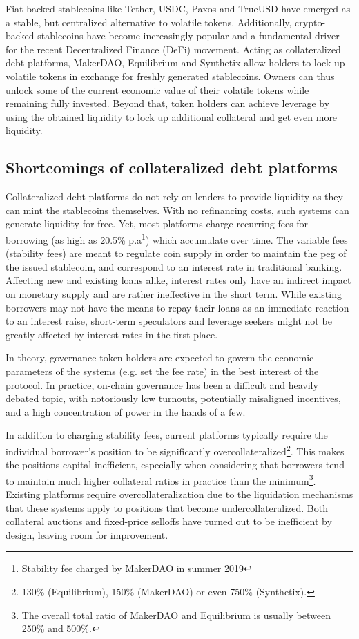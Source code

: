 \documentclass{article}
\begin{document}
Fiat-backed stablecoins like Tether, USDC, Paxos and TrueUSD have emerged as a stable, but centralized alternative to volatile tokens. Additionally, crypto-backed stablecoins have become increasingly popular and a fundamental driver for the recent Decentralized Finance (DeFi) movement. Acting as collateralized debt platforms, MakerDAO, Equilibrium and Synthetix allow holders to lock up volatile tokens in exchange for freshly generated stablecoins. Owners can thus unlock some of the current economic value of their volatile tokens while remaining fully invested. Beyond that, token holders can achieve leverage by using the obtained liquidity to lock up additional collateral and get even more liquidity.
\subsection{Shortcomings of collateralized debt platforms}
Collateralized debt platforms do not rely on lenders to provide liquidity as they can mint the stablecoins themselves. With no refinancing costs, such systems can generate liquidity for free. Yet, most platforms charge recurring fees for borrowing (as high as 20.5\% p.a\footnote{Stability fee charged by MakerDAO in summer 2019}) which accumulate over time. The variable fees (stability fees) are meant to regulate coin supply in order to maintain the peg of the issued stablecoin, and correspond to an interest rate in traditional banking. Affecting new and existing loans alike, interest rates only have an indirect impact on monetary supply and are rather ineffective in the short term. While existing borrowers may not have the means to repay their loans as an immediate reaction to an interest raise, short-term speculators and leverage seekers might not be greatly affected by interest rates in the first place.

In theory, governance token holders are expected to govern the economic parameters of the systems (e.g. set the fee rate) in the best interest of the protocol. In practice, on-chain governance has been a difficult and heavily debated topic, with notoriously low turnouts, potentially misaligned incentives, and a high concentration of power in the hands of a few.

In addition to charging stability fees, current platforms typically require the individual borrower’s position to be significantly overcollateralized\footnote{130\% (Equilibrium), 150\% (MakerDAO) or even 750\% (Synthetix).}. This makes the positions capital inefficient, especially when considering that borrowers tend to maintain much higher collateral ratios in practice than the minimum\footnote{The overall total ratio of MakerDAO and Equilibrium is usually between 250\% and 500\%.}. Existing platforms require overcollateralization due to the liquidation mechanisms that these systems apply to positions that become undercollateralized. Both collateral auctions and fixed-price selloffs have turned out to be inefficient by design, leaving room for improvement.
\end{document}
